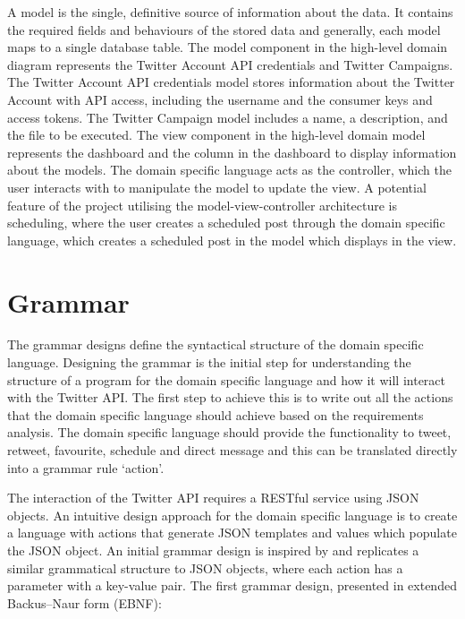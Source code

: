 A model is the single, definitive source of information about the data. It contains the required fields and behaviours of the stored data and generally, each model maps to a single database table. The model component in the high-level domain diagram represents the Twitter Account API credentials and Twitter Campaigns. The Twitter Account API credentials model stores information about the Twitter Account with API access, including the username and the consumer keys and access tokens. The Twitter Campaign model includes a name, a description, and the file to be executed. The view component in the high-level domain model represents the dashboard and the column in the dashboard to display information about the models. The domain specific language acts as the controller, which the user interacts with to manipulate the model to update the view. A potential feature of the project utilising the model-view-controller architecture is scheduling, where the user creates a scheduled post through the domain specific language, which creates a scheduled post in the model which displays in the view.

\section{Grammar}

The grammar designs define the syntactical structure of the domain specific language. Designing the grammar is the initial step for understanding the structure of a program for the domain specific language and how it will interact with the Twitter API. The first step to achieve this is to write out all the actions that the domain specific language should achieve based on the requirements analysis. The domain specific language should provide the functionality to tweet, retweet, favourite, schedule and direct message and this can be translated directly into a grammar rule `action'. \newline \par

The interaction of the Twitter API requires a RESTful service using JSON objects. An intuitive design approach for the domain specific language is to create a language with actions that generate JSON templates and values which populate the JSON object. An initial grammar design is inspired by and replicates a similar grammatical structure to JSON objects, where each action has a parameter with a key-value pair. The first grammar design, presented in extended Backus–Naur form (EBNF):


